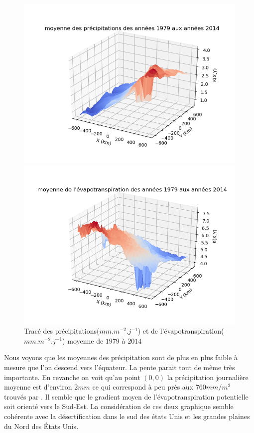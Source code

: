 \documentclass[a4paper,11pt]{article}
\numberwithin{equation}{section}
\begin{document}
\begin{figure}[H]
	\begin{center}
		\begin{minipage}[b]{0.49\linewidth}
			\centering \includegraphics[scale=0.5]{images/mean_precip.png}
		\end{minipage}\hfill
		\begin{minipage}[b]{0.49\linewidth}	
			\centering \includegraphics[scale=0.5]{images/mean_evap.png}
		\end{minipage}
	\end{center}
	\caption{Tracé des précipitations($mm.m^{-2}.j^{-1}$) et de l'évapotranspiration($mm.m^{-2}.j^{-1}$) moyenne de $1979$ à $2014$}
\end{figure} 
Nous voyons que les moyennes des précipitation sont de plus en plus faible à mesure que l'on descend vers l'équateur. La pente parait tout de même très importante. En revanche on voit qu'au point $(0,0)$ la précipitation journalière moyenne est d'environ $2mm$ ce qui correspond à peu près aux $760 mm/m^2$ trouvés par \cite{allen1991hydrology}. Il semble que le gradient moyen de l'évapotranspiration potentielle soit orienté vers le Sud-Est. La considération de ces deux graphique semble cohérente avec la désertification dans le sud des états Unis et les grandes plaines du Nord des États Unis.
\end{document}
